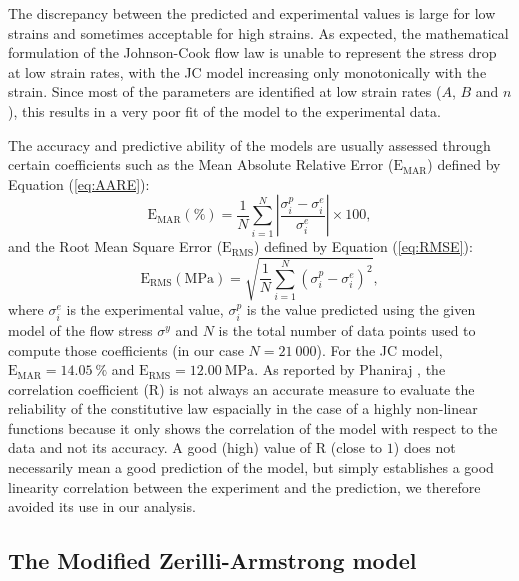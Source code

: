 \documentclass[metals,article,submit,pdftex,moreauthors]{Definitions/mdpi}
\DeclareRobustCommand{\RMSE}{\text{E}_\text{RMS}}
\DeclareRobustCommand{\MARE}{\text{E}_\text{MAR}}
\DeclareRobustCommand{\R}{\text{R}}
\DeclareRobustCommand{\MPa}{\text{MPa}}
\begin{document}
The discrepancy between the predicted and experimental values is large for low strains and sometimes acceptable for high strains.
As expected, the mathematical formulation of the Johnson-Cook flow law is unable to represent the stress drop at low strain rates, with the JC model increasing only monotonically with the strain.
Since most of the parameters are identified at low strain rates ($A$, $B$ and $n$), this results in a very poor fit of the model to the experimental data.

The accuracy and predictive ability of the models are usually assessed through certain coefficients such as the Mean Absolute Relative Error ($\MARE$) defined by Equation (\ref{eq:AARE}):
\begin{equation}
\MARE(\%) = \frac{1}{N} \sum_{i=1}^{N}{\left|\frac{\sigma_i^p -\sigma_i^e}{\sigma_i^e}\right|} \times 100, \label{eq:AARE}
\end{equation}
and the Root Mean Square Error ($\RMSE$) defined by Equation (\ref{eq:RMSE}):
\begin{equation}
\RMSE (\MPa) = \sqrt{\frac{1}{N} \sum_{i=1}^{N} \left(\sigma_i^p - \sigma_i^e\right)^2}, \label{eq:RMSE}
\end{equation}
where $\sigma_i^e$ is the experimental value, $\sigma_i^p$ is the value predicted using the given model of the flow stress $\sigma^y$ and $N$ is the total number of data points used to compute those coefficients (in our case $N=21~000$).
For the JC model, $\MARE=14.05~\%$ and $\RMSE=12.00~\MPa$.
As reported by Phaniraj \cite{Phaniraj-2003}, the correlation coefficient ($\R$) is not always an accurate measure to evaluate the reliability of the constitutive law espacially in the case of a highly non-linear functions because it only shows the correlation of the model with respect to the data and not its accuracy.
A good (high) value of $\R$ (close to $1$) does not necessarily mean a good prediction of the model, but simply establishes a good linearity correlation between the experiment and the prediction, we therefore avoided its use in our analysis.

\subsection{The Modified Zerilli-Armstrong model\label{sec:MZA}}
\end{document}
